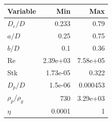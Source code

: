 \begin{tabular}{lrr}\toprule Variable & Min & Max\\\midrule
$D_e/D$ & 0.233 & 0.79\\
$a/D$ & 0.25 & 0.75\\
$b/D$ & 0.1 & 0.36\\
Re & 2.39e+03 & 7.58e+05\\
Stk & 1.73e-05 & 0.322\\
$D_p/D$ & 1.5e-06 & 0.000453\\
$\rho_p/\rho_g$ & 730 & 3.29e+03\\
$\eta$ & 0.0001 & 1\\
\bottomrule\end{tabular}